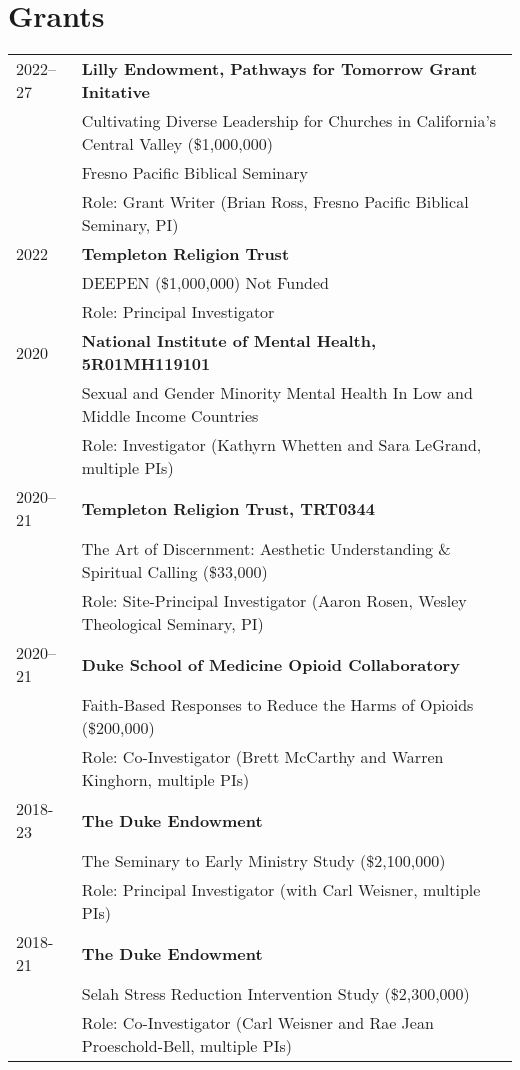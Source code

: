 \section*{Grants}
\begin{longtable}{p{} p{}}
2022--27 & \textbf{Lilly Endowment, Pathways for Tomorrow Grant Initative} \\
& Cultivating Diverse Leadership for Churches in California’s Central Valley (\$1,000,000)\\
& Fresno Pacific Biblical Seminary\\
& Role: Grant Writer (Brian Ross, Fresno Pacific Biblical Seminary, PI)\\
2022 & \textbf{Templeton Religion Trust} \\
	& DEEPEN (\$1,000,000) Not Funded \\
	& Role: Principal Investigator\\
2020 & \textbf{National Institute of Mental Health, 5R01MH119101} \\
& Sexual and Gender Minority Mental Health In Low and Middle Income Countries \\
& Role: Investigator (Kathyrn Whetten and Sara LeGrand, multiple PIs)\\

2020--21 & \textbf{Templeton Religion Trust, TRT0344} \\
& The Art of Discernment: Aesthetic Understanding \& Spiritual Calling (\$33,000)\\
& Role: Site-Principal Investigator (Aaron Rosen, Wesley Theological Seminary, PI)\\

2020--21 & \textbf{Duke School of Medicine Opioid Collaboratory}\\
& Faith-Based Responses to Reduce the Harms of Opioids (\$200,000) \\
& Role: Co-Investigator (Brett McCarthy and Warren Kinghorn, multiple PIs)\\

2018-23 & \textbf{The Duke Endowment}\\
& The Seminary to Early Ministry Study (\$2,100,000)\\
& Role: Principal Investigator (with Carl Weisner, multiple PIs)\\
\vspace{.2em}
2018-21 & \textbf{The Duke Endowment}\\
& Selah Stress Reduction Intervention Study (\$2,300,000)\\
& Role: Co-Investigator (Carl Weisner and Rae Jean Proeschold-Bell, multiple PIs)\\


\end{longtable}

